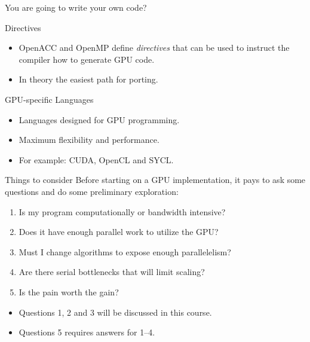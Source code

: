 \documentclass[aspectratio=43]{beamer}
\begin{document}
\begin{frame}[fragile]{You are going to write your own code?}

    \begin{info}{Directives}
        \begin{itemize}
            \item OpenACC and OpenMP define \emph{directives} that can be used to instruct the compiler how to generate GPU code.
            \item In theory the easiest path for porting.
        \end{itemize}
    \end{info}

    \begin{info}{GPU-specific Languages}
        \begin{itemize}
            \item Languages designed for GPU programming.
            \item Maximum flexibility and performance.
            \item For example: CUDA, OpenCL and SYCL.
        \end{itemize}
    \end{info}
\end{frame}

\begin{frame}[fragile]{Things to consider}
    Before starting on a GPU implementation, it pays to ask some questions and do some preliminary exploration:
    \begin{enumerate}
        \item Is my program computationally or bandwidth intensive?
        \item Does it have enough parallel work to utilize the GPU?
        \item Must I change algorithms to expose enough parallelelism?
        \item Are there serial bottlenecks that will limit scaling?
        \item Is the pain worth the gain?
    \end{enumerate}

    \begin{itemize}
        \item Questions 1, 2 and 3 will be discussed in this course.
        \item Questions 5 requires answers for 1--4.
    \end{itemize}
\end{frame}
\end{document}
